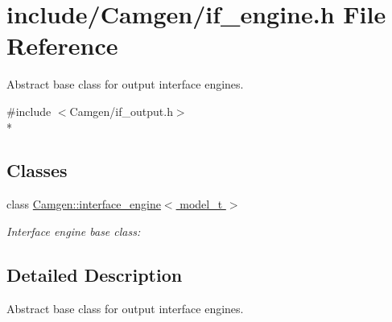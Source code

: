 \hypertarget{a00667}{}\section{include/\+Camgen/if\+\_\+engine.h File Reference}
\label{a00667}


Abstract base class for output interface engines.  


{\ttfamily \#include $<$Camgen/if\+\_\+output.\+h$>$}\\*
\subsection*{Classes}
\begin{DoxyCompactItemize}
\item 
class \hyperlink{a00318}{Camgen\+::interface\+\_\+engine$<$ model\+\_\+t $>$}
\begin{DoxyCompactList}\small\item\em Interface engine base class\+: \end{DoxyCompactList}\end{DoxyCompactItemize}


\subsection{Detailed Description}
Abstract base class for output interface engines. 

